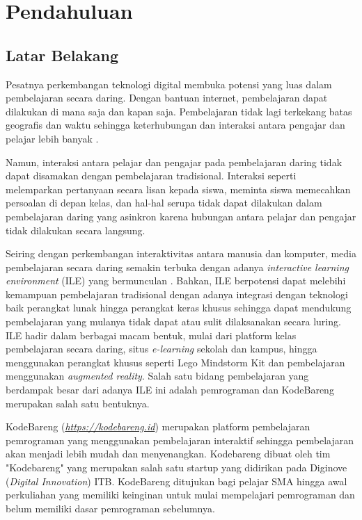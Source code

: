 \chapter{Pendahuluan}

\section{Latar Belakang}
\label{sec:latarbelakang}

Pesatnya perkembangan teknologi digital membuka potensi yang luas dalam pembelajaran secara daring. Dengan bantuan internet, pembelajaran dapat dilakukan di mana saja dan kapan saja. Pembelajaran tidak lagi terkekang batas geografis dan waktu sehingga keterhubungan dan interaksi antara pengajar dan pelajar lebih banyak \parencite{choy2004interactive,keengwe2010towards,psotka2012ile}.

Namun, interaksi antara pelajar dan pengajar pada pembelajaran daring tidak dapat disamakan dengan pembelajaran tradisional. Interaksi seperti melemparkan pertanyaan secara lisan kepada siswa, meminta siswa memecahkan persoalan di depan kelas, dan hal-hal serupa tidak dapat dilakukan dalam pembelajaran daring yang asinkron karena hubungan antara pelajar dan pengajar tidak dilakukan secara langsung.

Seiring dengan perkembangan interaktivitas antara manusia dan komputer, media pembelajaran secara daring semakin terbuka dengan adanya \textit{interactive learning environment} (ILE) yang bermunculan \parencite{psotka2012ile}. Bahkan, ILE berpotensi dapat melebihi kemampuan pembelajaran tradisional dengan adanya integrasi dengan teknologi baik perangkat lunak hingga perangkat keras khusus sehingga dapat mendukung pembelajaran yang mulanya tidak dapat atau sulit dilaksanakan secara luring. ILE  hadir dalam berbagai macam bentuk, mulai dari platform kelas pembelajaran secara daring, situs \textit{e-learning} sekolah dan kampus, hingga menggunakan perangkat khusus seperti Lego Mindstorm Kit dan pembelajaran menggunakan \textit{augmented reality}. Salah satu bidang pembelajaran yang berdampak besar dari adanya ILE ini adalah pemrograman dan KodeBareng merupakan salah satu bentuknya.

KodeBareng (\textit{\href{https://kodebareng.id}{https://kodebareng.id}}) merupakan platform pembelajaran pemrograman yang menggunakan pembelajaran interaktif sehingga pembelajaran akan menjadi lebih mudah dan menyenangkan. Kodebareng dibuat oleh tim "Kodebareng" yang merupakan salah satu startup yang didirikan pada Diginove (\textit{Digital Innovation}) ITB. KodeBareng ditujukan bagi pelajar SMA hingga awal perkuliahan yang memiliki keinginan untuk mulai mempelajari pemrograman dan belum memiliki dasar pemrograman sebelumnya.

